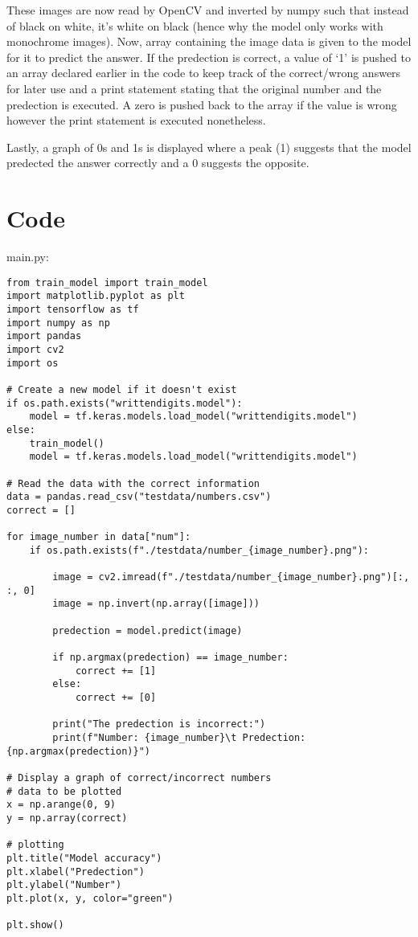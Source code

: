 \documentclass{article}
\begin{document}
These images are now read by OpenCV and inverted by numpy such that instead of
black on white, it's white on black (hence why the model only works with
monochrome images). Now, array containing the image data is given to the model
for it to predict the answer. If the predection is correct, a value of `1' is
pushed to an array declared earlier in the code to keep track of the correct/wrong
answers for later use and a print statement stating that the original number and
the predection is executed. A zero is pushed back to the array if the value is wrong
however the print statement is executed nonetheless.

Lastly, a graph of 0s and 1s is displayed where a peak (1) suggests that the model
predected the answer correctly and a 0 suggests the opposite.

\newpage

\section{Code}
main.py:
\begin{verbatim}
from train_model import train_model
import matplotlib.pyplot as plt
import tensorflow as tf
import numpy as np
import pandas
import cv2
import os

# Create a new model if it doesn't exist
if os.path.exists("writtendigits.model"):
    model = tf.keras.models.load_model("writtendigits.model")
else:
    train_model()
    model = tf.keras.models.load_model("writtendigits.model")

# Read the data with the correct information
data = pandas.read_csv("testdata/numbers.csv")
correct = []

for image_number in data["num"]:
    if os.path.exists(f"./testdata/number_{image_number}.png"):

        image = cv2.imread(f"./testdata/number_{image_number}.png")[:, :, 0]
        image = np.invert(np.array([image]))

        predection = model.predict(image)

        if np.argmax(predection) == image_number:
            correct += [1]
        else:
            correct += [0]

        print("The predection is incorrect:")
        print(f"Number: {image_number}\t Predection: {np.argmax(predection)}")

# Display a graph of correct/incorrect numbers
# data to be plotted
x = np.arange(0, 9)
y = np.array(correct)

# plotting
plt.title("Model accuracy")
plt.xlabel("Predection")
plt.ylabel("Number")
plt.plot(x, y, color="green")

plt.show()
\end{verbatim}
\end{document}
